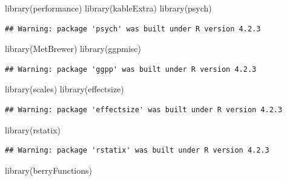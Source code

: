 \documentclass[
  bookmarksnumbered]{article}
\newenvironment{Shaded}{\begin{snugshade}}{\end{snugshade}}
\newcommand{\FunctionTok}[1]{\textcolor[rgb]{0.94,0.94,0.56}{#1}}
\newcommand{\NormalTok}[1]{\textcolor[rgb]{0.80,0.80,0.80}{#1}}
\begin{document}
\begin{Shaded}
\begin{Highlighting}[]
\FunctionTok{library}\NormalTok{(performance)}
\FunctionTok{library}\NormalTok{(kableExtra)}
\FunctionTok{library}\NormalTok{(psych)}
\end{Highlighting}
\end{Shaded}

\begin{verbatim}
## Warning: package 'psych' was built under R version 4.2.3
\end{verbatim}

\begin{Shaded}
\begin{Highlighting}[]
\FunctionTok{library}\NormalTok{(MetBrewer)}
\FunctionTok{library}\NormalTok{(ggpmisc)}
\end{Highlighting}
\end{Shaded}

\begin{verbatim}
## Warning: package 'ggpp' was built under R version 4.2.3
\end{verbatim}

\begin{Shaded}
\begin{Highlighting}[]
\FunctionTok{library}\NormalTok{(scales)}
\FunctionTok{library}\NormalTok{(effectsize)}
\end{Highlighting}
\end{Shaded}

\begin{verbatim}
## Warning: package 'effectsize' was built under R version 4.2.3
\end{verbatim}

\begin{Shaded}
\begin{Highlighting}[]
\FunctionTok{library}\NormalTok{(rstatix)}
\end{Highlighting}
\end{Shaded}

\begin{verbatim}
## Warning: package 'rstatix' was built under R version 4.2.3
\end{verbatim}

\begin{Shaded}
\begin{Highlighting}[]
\FunctionTok{library}\NormalTok{(berryFunctions)}
\end{Highlighting}
\end{Shaded}
\end{document}
